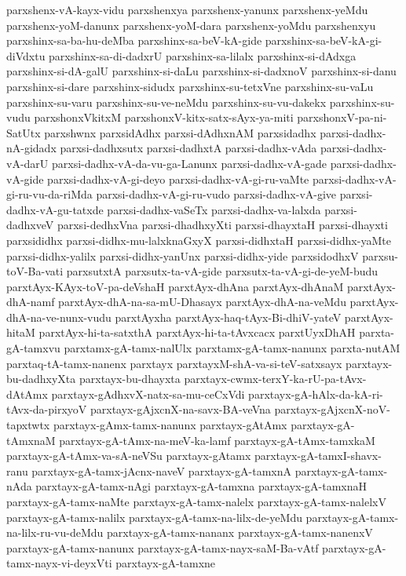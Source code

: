 {parxshenx-vA-kayx-vidu
parxshenxya
parxshenx-yanunx
parxshenx-yeMdu
parxshenx-yoM-danunx
parxshenx-yoM-dara
parxshenx-yoMdu
parxshenxyu
parxshinx-sa-ba-hu-deMba
parxshinx-sa-beV-kA-gide
parxshinx-sa-beV-kA-gi-diVdxtu
parxshinx-sa-di-dadxrU
parxshinx-sa-lilalx
parxshinx-si-dAdxga
parxshinx-si-dA-galU
parxshinx-si-daLu
parxshinx-si-dadxnoV
parxshinx-si-danu
parxshinx-si-dare
parxshinx-sidudx
parxshinx-su-tetxVne
parxshinx-su-vaLu
parxshinx-su-varu
parxshinx-su-ve-neMdu
parxshinx-su-vu-dakekx
parxshinx-su-vudu
parxshonxVkitxM
parxshonxV-kitx-satx-sAyx-ya-miti
parxshonxV-pa-ni-SatUtx
parxshwnx
parxsidAdhx
parxsi-dAdhxnAM
parxsidadhx
parxsi-dadhx-nA-gidadx
parxsi-dadhxsutx
parxsi-dadhxtA
parxsi-dadhx-vAda
parxsi-dadhx-vA-darU
parxsi-dadhx-vA-da-vu-ga-Lanunx
parxsi-dadhx-vA-gade
parxsi-dadhx-vA-gide
parxsi-dadhx-vA-gi-deyo
parxsi-dadhx-vA-gi-ru-vaMte
parxsi-dadhx-vA-gi-ru-vu-da-riMda
parxsi-dadhx-vA-gi-ru-vudo
parxsi-dadhx-vA-give
parxsi-dadhx-vA-gu-tatxde
parxsi-dadhx-vaSeTx
parxsi-dadhx-va-lalxda
parxsi-dadhxveV
parxsi-dedhxVna
parxsi-dhadhxyXti
parxsi-dhayxtaH
parxsi-dhayxti
parxsididhx
parxsi-didhx-mu-lalxknaGxyX
parxsi-didhxtaH
parxsi-didhx-yaMte
parxsi-didhx-yalilx
parxsi-didhx-yanUnx
parxsi-didhx-yide
parxsidodhxV
parxsu-toV-Ba-vati
parxsutxtA
parxsutx-ta-vA-gide
parxsutx-ta-vA-gi-de-yeM-budu
parxtAyx-KAyx-toV-pa-deVshaH
parxtAyx-dhAna
parxtAyx-dhAnaM
parxtAyx-dhA-namf
parxtAyx-dhA-na-sa-mU-Dhasayx
parxtAyx-dhA-na-veMdu
parxtAyx-dhA-na-ve-nunx-vudu
parxtAyxha
parxtAyx-haq-tAyx-Bi-dhiV-yateV
parxtAyx-hitaM
parxtAyx-hi-ta-satxthA
parxtAyx-hi-ta-tAvxcacx
parxtUyxDhAH
parxta-gA-tamxvu
parxtamx-gA-tamx-nalUlx
parxtamx-gA-tamx-nanunx
parxta-nutAM
parxtaq-tA-tamx-nanenx
parxtayx
parxtayxM-shA-va-si-teV-satxsayx
parxtayx-bu-dadhxyXta
parxtayx-bu-dhayxta
parxtayx-cwmx-terxY-ka-rU-pa-tAvx-dAtAmx
parxtayx-gAdhxvX-natx-sa-mu-ceCxVdi
parxtayx-gA-hAlx-da-kA-ri-tAvx-da-pirxyoV
parxtayx-gAjxcnX-na-savx-BA-veVna
parxtayx-gAjxcnX-noV-tapxtwtx
parxtayx-gAmx-tamx-nanunx
parxtayx-gAtAmx
parxtayx-gA-tAmxnaM
parxtayx-gA-tAmx-na-meV-ka-lamf
parxtayx-gA-tAmx-tamxkaM
parxtayx-gA-tAmx-va-sA-neVSu
parxtayx-gAtamx
parxtayx-gA-tamxI-shavx-ranu
parxtayx-gA-tamx-jAcnx-naveV
parxtayx-gA-tamxnA
parxtayx-gA-tamx-nAda
parxtayx-gA-tamx-nAgi
parxtayx-gA-tamxna
parxtayx-gA-tamxnaH
parxtayx-gA-tamx-naMte
parxtayx-gA-tamx-nalelx
parxtayx-gA-tamx-nalelxV
parxtayx-gA-tamx-nalilx
parxtayx-gA-tamx-na-lilx-de-yeMdu
parxtayx-gA-tamx-na-lilx-ru-vu-deMdu
parxtayx-gA-tamx-nananx
parxtayx-gA-tamx-nanenxV
parxtayx-gA-tamx-nanunx
parxtayx-gA-tamx-nayx-saM-Ba-vAtf
parxtayx-gA-tamx-nayx-vi-deyxVti
parxtayx-gA-tamxne
}
